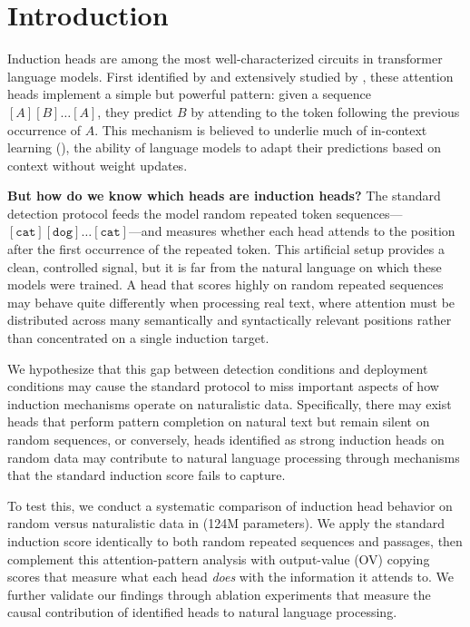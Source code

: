 \section{Introduction}
\label{sec:intro}

Induction heads are among the most well-characterized circuits in transformer language models.
First identified by \citet{elhage2021mathematical} and extensively studied by \citet{olsson2022context}, these attention heads implement a simple but powerful pattern: given a sequence $[A][B]\ldots[A]$, they predict $B$ by attending to the token following the previous occurrence of $A$.
This mechanism is believed to underlie much of in-context learning (\icl), the ability of language models to adapt their predictions based on context without weight updates.

{\bf But how do we know which heads are induction heads?}
The standard detection protocol \cite{olsson2022context} feeds the model random repeated token sequences---\eg $[\texttt{cat}][\texttt{dog}]\ldots[\texttt{cat}]$---and measures whether each head attends to the position after the first occurrence of the repeated token.
This artificial setup provides a clean, controlled signal, but it is far from the natural language on which these models were trained.
A head that scores highly on random repeated sequences may behave quite differently when processing real text, where attention must be distributed across many semantically and syntactically relevant positions rather than concentrated on a single induction target.

We hypothesize that this gap between detection conditions and deployment conditions may cause the standard protocol to miss important aspects of how induction mechanisms operate on naturalistic data.
Specifically, there may exist heads that perform pattern completion on natural text but remain silent on random sequences, or conversely, heads identified as strong induction heads on random data may contribute to natural language processing through mechanisms that the standard induction score fails to capture.

To test this, we conduct a systematic comparison of induction head behavior on random versus naturalistic data in \gpttwo (124M parameters).
We apply the standard induction score \cite{olsson2022context} identically to both random repeated sequences and \owt passages, then complement this attention-pattern analysis with output-value (OV) copying scores that measure what each head \emph{does} with the information it attends to.
We further validate our findings through ablation experiments that measure the causal contribution of identified heads to natural language processing.


